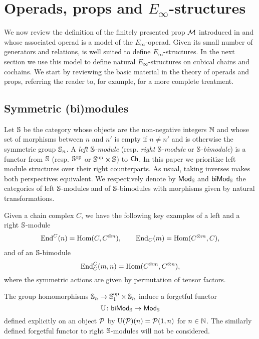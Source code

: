 
\section{Operads, props and \texorpdfstring{${E_\infty}$}{E-infty}-structures} \label{s:props}

We now review the definition of the finitely presented prop $\mathcal{M}$ introduced in \cite{medina2020prop1} and whose associated operad is a model of the $E_\infty$-operad.
Given its small number of generators and relations, is well suited to define $E_\infty$-structures.
In the next section we use this model to define natural $E_\infty$-structures on cubical chains and cochains.
We start by reviewing the basic material in the theory of operads and props, referring the reader to, for example, \cite{markl2008props} for a more complete treatment.

\subsection{Symmetric (bi)modules}

Let $\mathbb{S}$ be the category whose objects are the non-negative integers $\mathbb{N}$ and whose set of morphisms between $n$ and $n'$ is empty if $n \neq n'$ and is otherwise the symmetric group $\mathbb{S}_n$.
A \textit{left $\mathbb{S}$-module} (resp. \textit{right} $\mathbb{S}$-\textit{module} or $\mathbb{S}$-\textit{bimodule}) is a functor from $\mathbb{S}$ (resp. $\mathbb{S}^{\mathrm{op}}$ or $\mathbb{S}^{\mathrm{op}} \times \mathbb{S}$) to $\mathsf{Ch}$.
In this paper we prioritize left module structures over their right counterparts.
As usual, taking inverses makes both perspectives equivalent.
We respectively denote by $\mathsf{Mod}_{\mathbb{S}}$ and $\mathsf{biMod}_{\mathbb{S}}$ the categories of left $\mathbb{S}$-modules and of $\mathbb{S}$-bimodules with morphisms given by natural transformations.

Given a chain complex $C$, we have the following key examples of a left and a right $\mathbb{S}$-module
\begin{gather*}
	\mathrm{End}^C(n) = \mathrm{Hom}(C, C^{\otimes n}), \qquad
	\mathrm{End}_C(m) = \mathrm{Hom}(C^{\otimes m}, C),
\end{gather*}
and of an $\mathbb{S}$-bimodule
\[
\mathrm{End}^C_C(m,n) = \mathrm{Hom}(C^{\otimes m}, C^{\otimes n}),
\]
where the symmetric actions are given by permutation of tensor factors.

The group homomorphisms $\mathbb{S}_n \to \mathbb{S}_1^{\mathrm{op}} \times \mathbb{S}_n$ induce a forgetful functor
\begin{equation} \label{e:forgetful}
	\operatorname{U} \colon \mathsf{biMod}_{\mathbb{S}} \to \mathsf{Mod}_{\mathbb{S}}
\end{equation}
defined explicitly on an object $\mathcal{P}$ by $\operatorname{U}(\mathcal{P})(n) = \mathcal{P}(1, n)$ for $n \in \mathbb{N}$.
The similarly defined forgetful functor to right $\mathbb{S}$-modules will not be considered.

